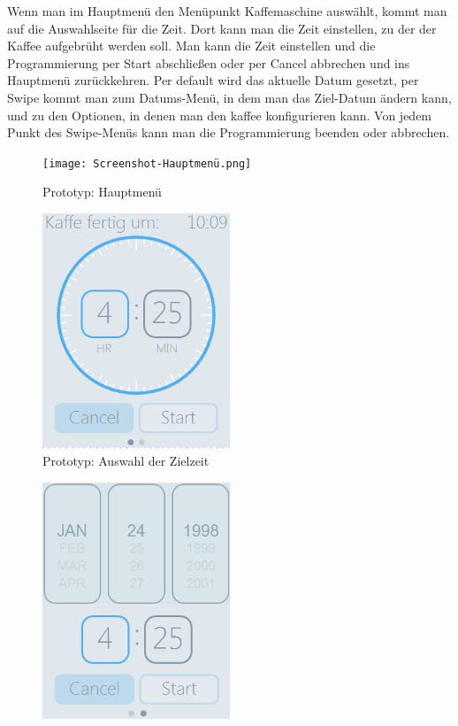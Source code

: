 \documentclass[a4paper,10pt]{article}
\begin{document}
\begin{enumerate}
Wenn man im Hauptmenü den Menüpunkt Kaffemaschine auswählt, kommt man auf die Auswahlseite für die Zeit. Dort kann man die Zeit einstellen, zu der der Kaffee aufgebrüht werden soll. Man kann die Zeit einstellen und die Programmierung per Start abschließen oder per Cancel abbrechen und ins Hauptmenü zurückkehren. Per default wird das aktuelle Datum gesetzt, per Swipe kommt man zum Datums-Menü, in dem man das Ziel-Datum ändern kann, und zu den Optionen, in denen man den kaffee konfigurieren kann. Von jedem Punkt des Swipe-Menüs kann man die Programmierung beenden oder abbrechen.
\begin{figure}[H]
	\centering
	\texttt{[image: Screenshot-Hauptmenü.png]} 
	\caption{Prototyp: Hauptmenü}
	\label{fig3}
\end{figure}
\begin{figure}[H]
	\centering
	\includegraphics[width=0.5\textwidth]{Screenshot-AuswahlZeit.png} 
	\caption{Prototyp: Auswahl der Zielzeit}
	\label{fig4}
\end{figure}
\begin{figure}[H]
	\centering
	\includegraphics[width=0.5\textwidth]{Screenshot-AuswahlDatum.png} 

\end{figure}
\end{enumerate}
\end{document}
